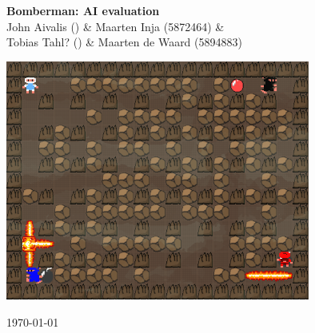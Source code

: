 

\begin{center}
\Huge \textbf{Bomberman: AI evaluation}\\
\vspace*{0.8cm}
\Large John Aivalis () \& Maarten Inja (5872464) \& \\ Tobias Tahl? () \& Maarten de Waard (5894883) 

\vspace*{4cm}

\includegraphics[width=10cm]{resources/bbman}

\vfill
\today

\end{center}
\thispagestyle{empty}
